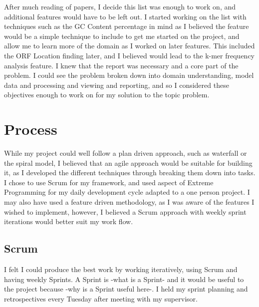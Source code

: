 After much reading of papers, I decide this list was enough to work on, and additional features would have to be left out. I started working on the list with techniques such as the GC Content percentage in mind as I believed the feature would be a simple technique to include to get me started on the project, and allow me to learn more of the domain as I worked on later features. This included the ORF Location finding later, and I believed would lead to the k-mer frequency analysis feature. I knew that the report was necessary and a core part of the problem. I could see the problem broken down into domain understanding, model data and processing and viewing and reporting, and so I considered these objectives enough to work on for my solution to the topic problem.




\section{Process}
While my project could well follow a plan driven approach, such as waterfall or the spiral model, I believed that an agile approach would be suitable for building it, as I developed the different techniques through breaking them down into tasks. I chose to use Scrum for my framework, and used aspect of Extreme Programming for my daily development cycle adapted to a one person project. I may also have used a feature driven methodology, as I was aware of the features I wished to implement, however, I believed a Scrum approach with weekly sprint iterations would better suit my work flow.

\subsection{Scrum}
I felt I could produce the best work by working iteratively, using Scrum and having weekly Sprints. A Sprint is -what is a Sprint- and it would be useful to the project because -why is a Sprint useful here-. I held my sprint planning and retrospectives every Tuesday after meeting with my supervisor. 

